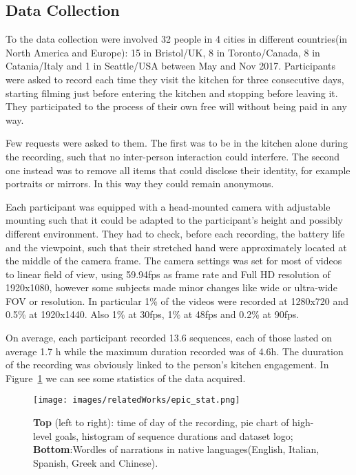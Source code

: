 

\subsection{Data Collection}
To the data collection were involved 32 people in 4 cities in different
countries(in North America and Europe): 15 in Bristol/UK, 8 in Toronto/Canada,
8 in Catania/Italy and 1 in Seattle/USA between May and Nov 2017. Participants
were asked to record each time they visit the kitchen for three consecutive days,
starting filming just before entering the kitchen and stopping before leaving it.
They participated to the process of their own free will without being paid in any way.


Few requests were asked to them. The first was to be in the kitchen alone during
the recording, such that no inter-person interaction could interfere.  The
second one instead was to remove all items that could disclose their identity, for
example portraits or mirrors. In this way they could remain anonymous.

Each participant was equipped with a head-mounted camera with adjustable mounting
such that it could be adapted to the participant's height and possibly different 
environment. They had to check, before each recording, the battery life and the viewpoint,
such that their stretched hand were approximately located at the middle of the 
camera frame.
The camera settings was set for most of videos to linear field of view, using 
59.94fps as frame rate and Full HD resolution of 1920x1080, however some 
subjects made minor changes like wide or ultra-wide FOV or resolution.
In particular 1\% of the videos were recorded at 1280x720 and 0.5\% at 1920x1440.
Also 1\% at 30fps, 1\% at 48fps and 0.2\% at 90fps.

On average, each participant recorded 13.6 sequences, each of those lasted on average 1.7 h
while the maximum duration recorded was of 4.6h. The duuration of the recording was obviously 
linked to the person's kitchen engagement. In Figure~\ref{fig:epic_stat} we can see some statistics
of the data acquired.

\begin{figure}
    \centering
    \texttt{[image: images/relatedWorks/epic\_stat.png]} %
    \caption{\textbf{Top} (left to right): time of day of the recording, pie chart of high-level goals,
        histogram of sequence durations and dataset logo; \textbf{Bottom}:Wordles
        of narrations in native languages(English, Italian, Spanish, Greek and Chinese).}\label{fig:epic_stat}
\end{figure}

